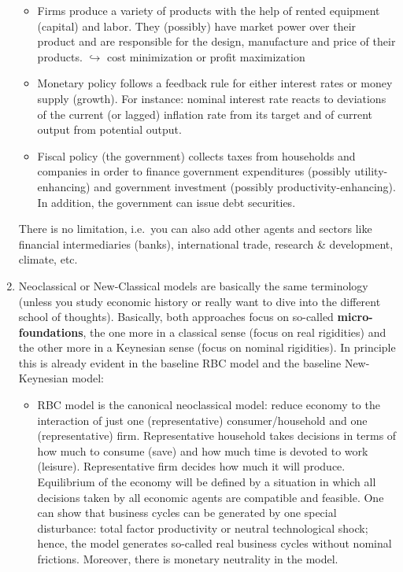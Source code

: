 \begin{enumerate}
\begin{itemize}
\item Firms produce a variety of products with the help of rented equipment (capital) and labor.
They (possibly) have market power over their product and are responsible for the design, manufacture and price of their products.
\(\hookrightarrow \) cost minimization or profit maximization

\item Monetary policy follows a feedback rule for either interest rates or money supply (growth).
For instance: nominal interest rate reacts to deviations of the current (or lagged) inflation rate from its target and of current output from potential output.

\item Fiscal policy (the government) collects taxes from households and companies
  in order to finance government expenditures (possibly utility-enhancing) and government investment (possibly productivity-enhancing).
In addition, the government can issue debt securities.
\end{itemize}
There is no limitation, i.e.\ you can also add other agents and sectors like financial intermediaries (banks), international trade, research \& development, climate, etc.

\item Neoclassical or New-Classical models are basically the same terminology (unless you study economic history or really want to dive into the different school of thoughts).
Basically, both approaches focus on so-called \textbf{micro-foundations},
  the one more in a classical sense (focus on real rigidities)
  and the other more in a Keynesian sense (focus on nominal rigidities).
In principle this is already evident in the baseline RBC model and the baseline New-Keynesian model:

\begin{itemize}

\item RBC model is the canonical neoclassical model:
  reduce economy to the interaction of just one (representative) consumer/household and one (representative) firm.
Representative household takes decisions in terms of how much to consume (save) and how much time is devoted to work (leisure).
Representative firm decides how much it will produce.
Equilibrium of the economy will be defined by a situation in which all decisions taken by all economic agents are compatible and feasible.
One can show that business cycles can be generated by one special disturbance:
  total factor productivity or neutral technological shock;
  hence, the model generates so-called real business cycles without nominal frictions.
Moreover, there is monetary neutrality in the model.


\end{itemize}
\end{enumerate}
